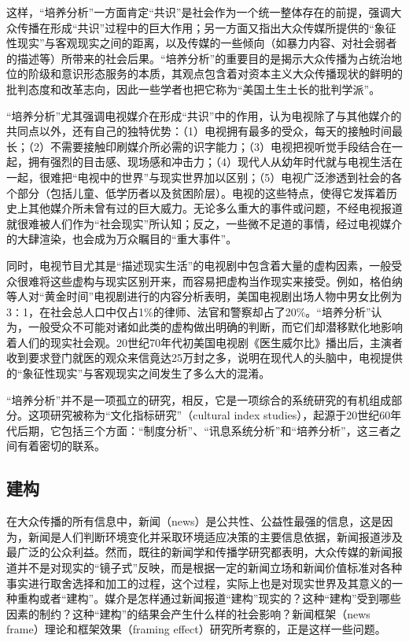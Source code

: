 \documentclass[UTF8,12pt]{ctexart}
\numberwithin{equation}{section} %
\numberwithin{figure}{section}
\numberwithin{table}{section}
\begin{document}
	这样，“培养分析”一方面肯定“共识”是社会作为一个统一整体存在的前提，强调大众传播在形成“共识”过程中的巨大作用；另一方面又指出大众传媒所提供的“象征性现实”与客观现实之间的距离，以及传媒的一些倾向（如暴力内容、对社会弱者的描述等）所带来的社会后果。“培养分析”的重要目的是揭示大众传播为占统治地位的阶级和意识形态服务的本质，其观点包含着对资本主义大众传播现状的鲜明的批判态度和改革志向，因此一些学者也把它称为“美国土生土长的批判学派”。
	
	“培养分析”尤其强调电视媒介在形成“共识”中的作用，认为电视除了与其他媒介的共同点以外，还有自己的独特优势：（1）电视拥有最多的受众，每天的接触时间最长；（2）不需要接触印刷媒介所必需的识字能力；（3）电视把视听觉手段结合在一起，拥有强烈的目击感、现场感和冲击力；（4）现代人从幼年时代就与电视生活在一起，很难把“电视中的世界”与现实世界加以区别；（5）电视广泛渗透到社会的各个部分（包括儿童、低学历者以及贫困阶层）。电视的这些特点，使得它发挥着历史上其他媒介所未曾有过的巨大威力。无论多么重大的事件或问题，不经电视报道就很难被人们作为“社会现实”所认知；反之，一些微不足道的事情，经过电视媒介的大肆渲染，也会成为万众瞩目的“重大事件”。
	
	同时，电视节目尤其是“描述现实生活”的电视剧中包含着大量的虚构因素，一般受众很难将这些虚构与现实区别开来，而容易把虚构当作现实来接受。例如，格伯纳等人对“黄金时间”电视剧进行的内容分析表明，美国电视剧出场人物中男女比例为3∶1，在社会总人口中仅占1\%的律师、法官和警察却占了20\%。“培养分析”认为，一般受众不可能对诸如此类的虚构做出明确的判断，而它们却潜移默化地影响着人们的现实社会观。20世纪70年代初美国电视剧《医生威尔比》播出后，主演者收到要求登门就医的观众来信竟达25万封之多，说明在现代人的头脑中，电视提供的“象征性现实”与客观现实之间发生了多么大的混淆。
	
	
	“培养分析”并不是一项孤立的研究，相反，它是一项综合的系统研究的有机组成部分。这项研究被称为“文化指标研究”（cultural index studies），起源于20世纪60年代后期，它包括三个方面：“制度分析”、“讯息系统分析”和“培养分析”，这三者之间有着密切的联系。
	\subsection{建构}
	在大众传播的所有信息中，新闻（news）是公共性、公益性最强的信息，这是因为，新闻是人们判断环境变化并采取环境适应决策的主要信息依据，新闻报道涉及最广泛的公众利益。然而，既往的新闻学和传播学研究都表明，大众传媒的新闻报道并不是对现实的“镜子式”反映，而是根据一定的新闻立场和新闻价值标准对各种事实进行取舍选择和加工的过程，这个过程，实际上也是对现实世界及其意义的一种重构或者“建构”。媒介是怎样通过新闻报道“建构”现实的？这种“建构”受到哪些因素的制约？这种“建构”的结果会产生什么样的社会影响？新闻框架（news frame）理论和框架效果（framing effect）研究所考察的，正是这样一些问题。
	
\end{document}
